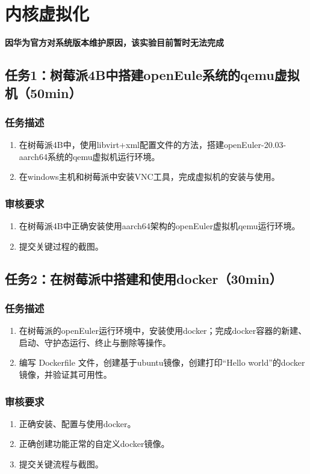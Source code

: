 \documentclass{article}
\begin{document}
\newpage

\section{内核虚拟化}
\textbf{因华为官方对系统版本维护原因，该实验目前暂时无法完成}

\subsection{任务1：树莓派4B中搭建openEule系统的qemu虚拟机（50min）}
\subsubsection{任务描述}
\begin{enumerate}
    \item 在树莓派4B中，使用libvirt+xml配置文件的方法，搭建openEuler-20.03-aarch64系统的qemu虚拟机运行环境。
    \item 在windows主机和树莓派中安装VNC工具，完成虚拟机的安装与使用。
\end{enumerate}

\subsubsection{审核要求}
\begin{enumerate}
    \item 在树莓派4B中正确安装使用aarch64架构的openEuler虚拟机qemu运行环境。
    \item 提交关键过程的截图。
\end{enumerate}
\subsection{任务2：在树莓派中搭建和使用docker（30min）}

\subsubsection{任务描述}
\begin{enumerate}
    \item 在树莓派的openEuler运行环境中，安装使用docker；完成docker容器的新建、启动、守护态运行、终止与删除等操作。
    \item 编写 Dockerfile 文件，创建基于ubuntu镜像，创建打印“Hello world”的docker镜像，并验证其可用性。

\end{enumerate}

\subsubsection{审核要求}
\begin{enumerate}
    \item 正确安装、配置与使用docker。
    \item 正确创建功能正常的自定义docker镜像。
    \item 提交关键流程与截图。
\end{enumerate}
\end{document}
